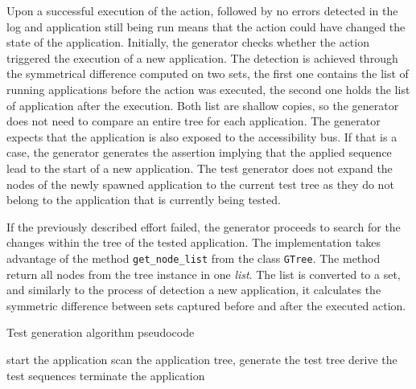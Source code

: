Upon a successful execution of the action, followed by no errors detected in the log and application still being run means that the action could have changed the state of the application. Initially, the generator checks whether the action triggered the execution of a new application. The detection is achieved through the symmetrical difference computed on two sets, the first one contains the list of running applications before the action was executed, the second one holds the list of application after the execution. Both list are shallow copies, so the generator does not need to compare an entire tree for each application. The generator expects that the application is also exposed to the accessibility bus. If that is a case, the generator generates the assertion implying that the applied sequence lead to the start of a new application. The test generator does not expand the nodes of the newly spawned application to the current test tree as they do not belong to the application that is currently being tested.

If the previously described effort failed, the generator proceeds to search for the changes within the tree of the tested application. The implementation takes advantage of the method \texttt{get\_node\_list} from the class \texttt{GTree}. The method return all nodes from the tree instance in one \textit{list}. The list is converted to a set, and similarly to the process of detection a new application, it calculates the symmetric difference between sets captured before and after the executed action.



\begin{center}
\begin{algorithm}[H]
\caption{Test generation algorithm pseudocode}
\label{test_gen_algorithm}
\SetAlgoLined
{}
 start the application\;
 scan the application tree, generate the test tree\;
 derive the test sequences\;
 terminate the application\;
\end{algorithm}
\end{center}

